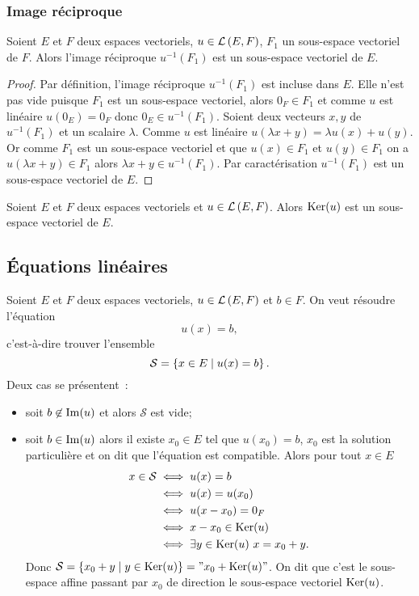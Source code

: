 \subsubsection{Image réciproque}

\begin{theo}
  Soient \(E\) et \(F\) deux espaces vectoriels, \(u \in \mathcal{L}\left(E,F\right)\), \(F_1\) 
  un sous-espace vectoriel de \(F\). Alors l'image réciproque \(u^{-1}(F_1)\) 
  est un sous-espace vectoriel de \(E\).
\end{theo}
\begin{proof}
  Par définition, l'image réciproque \(u^{-1}(F_1)\) est incluse dans \(E\). 
  Elle n'est pas vide puisque \(F_1\) est un sous-espace vectoriel, alors \(0_F 
  \in F_1\) et comme \(u\) est linéaire \(u(0_E)=0_F\) donc \(0_E \in 
  u^{-1}(F_1)\). Soient deux vecteurs \(x,y\) de \(u^{-1}(F_1)\) et un scalaire 
  \(\lambda\). Comme \(u\) est linéaire \(u(\lambda x+y)=\lambda u(x)+u(y)\). Or 
  comme \(F_1\) est un sous-espace vectoriel et que \(u(x) \in F_1\) et \(u(y) 
  \in F_1\) on a \(u(\lambda x+y) \in F_1\) alors \(\lambda x+y \in 
  u^{-1}(F_1)\). Par caractérisation \(u^{-1}(F_1)\) est un sous-espace 
  vectoriel de \(E\).
\end{proof}

\begin{corth}
  Soient \(E\) et \(F\) deux espaces vectoriels et \(u \in \mathcal{L}\left(E,F\right)\). Alors 
  \(\operatorname{Ker}(u)\) est un sous-espace vectoriel de \(E\).
\end{corth}

\subsection{Équations linéaires}
Soient \(E\) et \(F\) deux espaces vectoriels, \(u \in \mathcal{L}\left(E,F\right)\) et \(b \in 
F\). On veut résoudre l'équation
\begin{equation}
  u(x)=b,
\end{equation}
c'est-à-dire trouver l'ensemble
\begin{equation}
  \mathcal{S}=\left\{x \in E\mathrel{}\middle|\mathrel{}u(x)=b\right\}.
\end{equation}
Deux cas se présentent~:
\begin{itemize}
  \item soit \(b \not\in \operatorname{Im}(u)\) et alors \(\mathcal{S}\) est vide;
  \item soit \(b \in \operatorname{Im}(u)\) alors il existe \(x_0 \in E\) tel que 
    \(u(x_0)=b\), \(x_0\) est la solution particulière et on dit que l'équation 
    est compatible. Alors pour tout \(x \in E\)
    \begin{align}
      x \in \mathcal{S} &\iff u(x)=b \\
      &\iff u(x)=u(x_0) \\
      &\iff u(x-x_0)=0_F \\
      &\iff x-x_0 \in \operatorname{Ker}(u) \\
      &\iff \exists y \in \operatorname{Ker}(u) \ x=x_0+y.
    \end{align}
    Donc \(\mathcal{S}=\left\{x_0 + y\mathrel{}\middle|\mathrel{}y \in \operatorname{Ker}(u)\right\} = "x_0+\operatorname{Ker}(u)"\). On dit 
    que c'est le sous-espace affine passant par \(x_0\) de direction le 
    sous-espace vectoriel \(\operatorname{Ker}(u)\).
\end{itemize}

